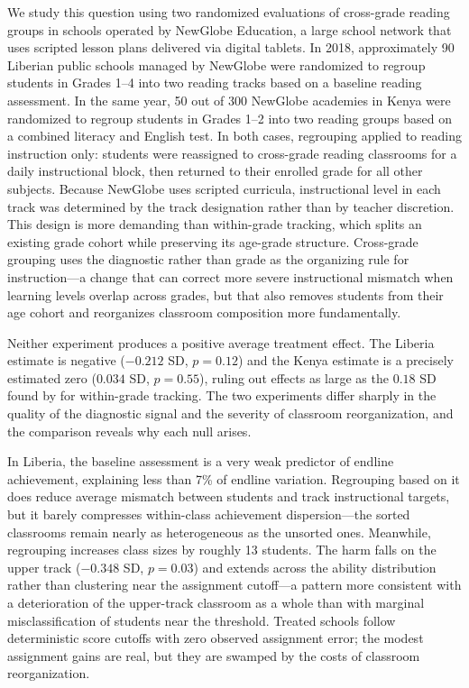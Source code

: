 \documentclass[11pt]{article}
\begin{document}
We study this question using two randomized evaluations of cross-grade reading groups in schools operated by NewGlobe Education, a large school network that uses scripted lesson plans delivered via digital tablets. In 2018, approximately 90 Liberian public schools managed by NewGlobe were randomized to regroup students in Grades 1--4 into two reading tracks based on a baseline reading assessment. In the same year, 50 out of 300 NewGlobe academies in Kenya were randomized to regroup students in Grades 1--2 into two reading groups based on a combined literacy and English test. In both cases, regrouping applied to reading instruction only: students were reassigned to cross-grade reading classrooms for a daily instructional block, then returned to their enrolled grade for all other subjects. Because NewGlobe uses scripted curricula, instructional level in each track was determined by the track designation rather than by teacher discretion. This design is more demanding than within-grade tracking, which splits an existing grade cohort while preserving its age-grade structure. Cross-grade grouping uses the diagnostic rather than grade as the organizing rule for instruction---a change that can correct more severe instructional mismatch when learning levels overlap across grades, but that also removes students from their age cohort and reorganizes classroom composition more fundamentally.

Neither experiment produces a positive average treatment effect. The Liberia estimate is negative ($-0.212$ SD, $p = 0.12$) and the Kenya estimate is a precisely estimated zero ($0.034$ SD, $p = 0.55$), ruling out effects as large as the $0.18$ SD found by \citet{duflo2011peer} for within-grade tracking. The two experiments differ sharply in the quality of the diagnostic signal and the severity of classroom reorganization, and the comparison reveals why each null arises.

In Liberia, the baseline assessment is a very weak predictor of endline achievement, explaining less than 7\% of endline variation. Regrouping based on it does reduce average mismatch between students and track instructional targets, but it barely compresses within-class achievement dispersion---the sorted classrooms remain nearly as heterogeneous as the unsorted ones. Meanwhile, regrouping increases class sizes by roughly 13 students. The harm falls on the upper track ($-0.348$ SD, $p = 0.03$) and extends across the ability distribution rather than clustering near the assignment cutoff---a pattern more consistent with a deterioration of the upper-track classroom as a whole than with marginal misclassification of students near the threshold. Treated schools follow deterministic score cutoffs with zero observed assignment error; the modest assignment gains are real, but they are swamped by the costs of classroom reorganization.
\end{document}
